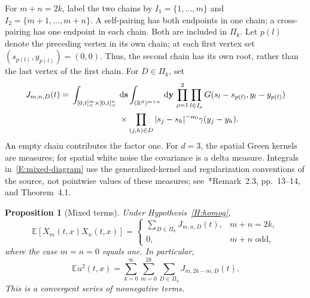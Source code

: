 \documentclass[12pt]{article}
\numberwithin{equation}{section}
\newtheorem{proposition}[theorem]{Proposition}
\theoremstyle{definition}
\newcommand{\R}{\mathbb{R}}
\newcommand{\E}{\mathbb{E}}
\newcommand{\ud}{\,\mathrm{d}}
\begin{document}
For $m+n=2k$, label the two chains by
$I_1=\{1,\ldots,m\}$ and $I_2=\{m+1,\ldots,m+n\}$.
A self-pairing has both endpoints in one chain; a cross-pairing has one
endpoint in each chain. Both are included in $\Pi_k$.
Let $p(l)$ denote the preceding vertex in its own chain; at each first
vertex set $(s_{p(l)},y_{p(l)})=(0,0)$. Thus, the second chain has its own
root, rather than the last vertex of the first chain. For $D\in\Pi_k$, set
\begin{equation}\label{E:mixed-diagram}
  \begin{split}
    J_{m,n,D}(t)
    ={}&\int_{[0,t]^m_<\times[0,t]^n_<}\ud\mathbf s
    \int_{(\R^d)^{m+n}}\ud\mathbf y\,
    \prod_{\rho=1}^2\prod_{l\in I_\rho}
    G(s_l-s_{p(l)},y_l-y_{p(l)})\\
    &\hspace{20mm}\times
    \prod_{(j,h)\in D}|s_j-s_h|^{-\alpha_0}\gamma(y_j-y_h).
  \end{split}
\end{equation}
An empty chain contributes the factor one. For $d=3$, the spatial Green
kernels are measures; for spatial white noise the covariance is a delta
measure. Integrals in~\eqref{E:mixed-diagram} use the generalized-kernel
and regularization conventions of the source, not pointwise values of
these measures; see~\cite{chen:author2026:time-dependency}*{Remark~2.3,
pp.~13--14, and Theorem~4.1}.

\begin{proposition}[Mixed terms]\label{P:mixed}
  Under Hypothesis~\ref{H:homog},
  \begin{equation}\label{E:mixed-moment}
    \E[X_m(t,x)X_n(t,x)]
    =\begin{cases}
      \displaystyle\sum_{D\in\Pi_k}J_{m,n,D}(t),&m+n=2k,\\
      0,&m+n\text{ odd},
    \end{cases}
  \end{equation}
  where the case $m=n=0$ equals one. In particular,
  \begin{equation}\label{E:full-second}
    \E u^2(t,x)=\sum_{k=0}^\infty\sum_{m=0}^{2k}
    \sum_{D\in\Pi_k}J_{m,2k-m,D}(t).
  \end{equation}
  This is a convergent series of nonnegative terms.
\end{proposition}
\end{document}
